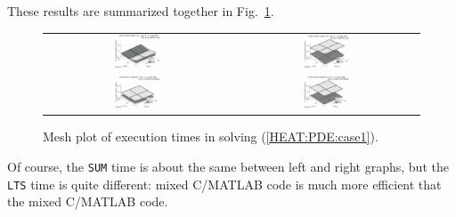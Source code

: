 \documentclass[a4paper,10pt]{report}%
\begin{document}
These results are summarized together in Fig.~\ref{EX3b_times3D_tol4}.
\begin{figure}[htb]
\centering
\begin{tabular}{cc}
\includegraphics[width=0.25\textwidth]{./FIGS/EX3b/EX3b_times3D_tol4_1.eps} &
\includegraphics[width=0.25\textwidth]{./FIGS/EX3b/EX3b_times3D_tol4_3.eps} \\
\includegraphics[width=0.25\textwidth]{./FIGS/EX3b/EX3b_times3D_tol4_2.eps} &
\includegraphics[width=0.25\textwidth]{./FIGS/EX3b/EX3b_times3D_tol4_4.eps}
\end{tabular}
\caption{\small Mesh plot of execution times in solving (\ref{HEAT:PDE:case1}).}
\label{EX3b_times3D_tol4}
\end{figure}

\noindent Of course, the {\tt SUM} time is about the same between left and right graphs, but the
{\tt LTS} time is quite different: mixed C/MATLAB code is much more efficient that the mixed C/MATLAB
code.



\end{document}
